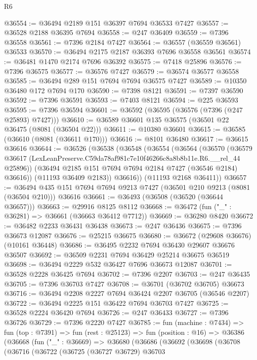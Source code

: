 \begin{lexlean}{R6}
\begin{coremodule}
@36554 := @36494 @2189 @151 @36397 @7694 @36533 @7427
@36557 := @36528 @2188 @36395 @7694
@36558 := @247 @36409
@36559 := @7396 @36558
@36561 := @7396 @2184 @7427
@36564 := @36557 (@36559 @36561) @36533
@36570 := @36494 @2175 @2187 @36393 @7696 @36558 @36561
@36574 := @36481 @1470 @2174 @7696 @36392
@36575 := @7418 @25896
@36576 := @7396 @36575
@36577 := @36576 @7427
@36579 := @36574 @36577 @36558
@36585 := @36494 @289 @151 @7694 @7694 @36575 @7427
@36589 := @10350 @36480 @172 @7694 @170
@36590 := @7398 @8121
@36591 := @7397 @36590
@36592 := @7396 @36591
@36593 := @7403 @8121
@36594 := @225 @36593
@36595 := @7396 @36594
@36601 := @36592 (@36595 (@36576 (@7396 (@247 @25893) @7427)))
@36610 := @36589 @36601 @135 @36575 (@36501 @22 @36475 (@8081 (@36504 @22)))
@36611 := @10380 @36601
@36615 := @36585 (@36610 (@8081 (@36611 @170)))
@36616 := @8101 @36480
@36617 := @36615 @36616
@36644 := @36526
    (@36538
      (@36548
        (@36554
          (@36564
            (@36570
              (@36579 @36617 (LexLeanPreserve.C59da78af981c7e10f46266c8a8b8b11e.R6.__rel_44 @25896))
              (@36494 @2185 @151 @7694 @7694 @2184 @7427 (@36546 @2184) @36616))
            (@11193 @36409 @2183))
          @36616))
      (@11193 @2168 @36411))
@36657 := @36494 @435 @151 @7694 @7694 @9213 @7427 (@36501 @210 @9213 (@8081 (@36504 @210))) @36616
@36661 := @36493 (@36508 (@36520 (@36644 @36657)))
@36663 := @29916 @8125 @8112
@36668 := @36472 (fun ("_" : @36281) => @36661 (@36663 @36412 @7712))
@36669 := @36280 @8420
@36672 := @36482 @2233 @36431 @36438
@36673 := @247 @36436
@36675 := @7396 @36673 @12087
@36676 := @25215 @36675
@36680 := @36672 (@29608 @36676) (@10161 @36448)
@36686 := @36495 @2232 @7694 @36430 @29607 @36676 @36507
@36692 := @36509 @2231 @7694 @36429 @25214 @36675 @36519
@36698 := @36494 @2229 @532 @36427 @7696 @36673 @12087
@36701 := @36528 @2228 @36425 @7694
@36702 := @7396 @2207
@36703 := @247 @36435
@36705 := @7396 @36703 @7427
@36708 := @36701 (@36702 @36705) @36673
@36716 := @36494 @2208 @2227 @7694 @36424 @2207 @36705 (@36546 @2207)
@36722 := @36494 @2225 @151 @36422 @7694 @36703 @7427
@36725 := @36528 @2224 @36420 @7694
@36726 := @247 @36433
@36727 := @7396 @36726
@36729 := @7396 @2220 @7427
@36785 := fun (machine : @7434) =>
  fun (top : @7391) =>
  fun (rest : @25123) =>
  fun (position : @16) =>
  @36386
    (@36668
      (fun ("_" : @36669) =>
      @36680
        (@36686
          (@36692
            (@36698
              (@36708
                (@36716
                  (@36722
                    (@36725
                      (@36727 @36729)
                      @36703

\end{coremodule}
\end{lexlean}
